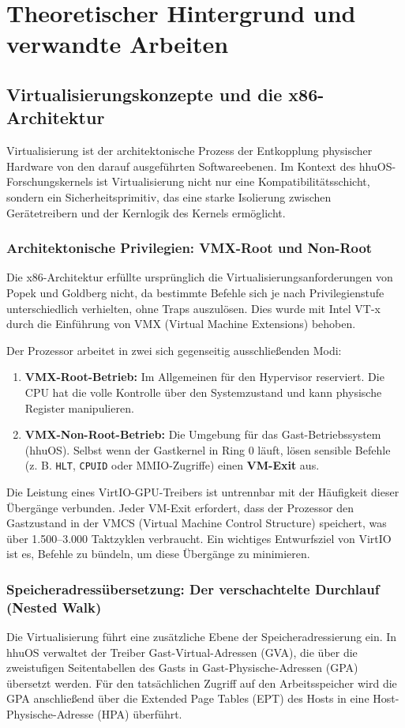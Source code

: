 \chapter{Theoretischer Hintergrund und verwandte Arbeiten}

\section{Virtualisierungskonzepte und die x86-Architektur}
Virtualisierung ist der architektonische Prozess der Entkopplung physischer Hardware von den darauf ausgeführten Softwareebenen. Im Kontext des hhuOS-Forschungskernels ist Virtualisierung nicht nur eine Kompatibilitätsschicht, sondern ein Sicherheitsprimitiv, das eine starke Isolierung zwischen Gerätetreibern und der Kernlogik des Kernels ermöglicht.

\subsection{Architektonische Privilegien: VMX-Root und Non-Root}
Die x86-Architektur erfüllte ursprünglich die Virtualisierungsanforderungen von Popek und Goldberg nicht, da bestimmte Befehle sich je nach Privilegienstufe unterschiedlich verhielten, ohne Traps auszulösen. Dies wurde mit Intel VT-x durch die Einführung von VMX (Virtual Machine Extensions) behoben.

Der Prozessor arbeitet in zwei sich gegenseitig ausschließenden Modi:
\begin{enumerate}
    \item \textbf{VMX-Root-Betrieb:} Im Allgemeinen für den Hypervisor reserviert. Die CPU hat die volle Kontrolle über den Systemzustand und kann physische Register manipulieren.
    \item \textbf{VMX-Non-Root-Betrieb:} Die Umgebung für das Gast-Betriebssystem (hhuOS). Selbst wenn der Gastkernel in Ring 0 läuft, lösen sensible Befehle (z. B. \texttt{HLT}, \texttt{CPUID} oder MMIO-Zugriffe) einen \textbf{VM-Exit} aus.
\end{enumerate}

Die Leistung eines VirtIO-GPU-Treibers ist untrennbar mit der Häufigkeit dieser Übergänge verbunden. Jeder VM-Exit erfordert, dass der Prozessor den Gastzustand in der VMCS (Virtual Machine Control Structure) speichert, was über 1.500–3.000 Taktzyklen verbraucht. Ein wichtiges Entwurfsziel von VirtIO ist es, Befehle zu bündeln, um diese Übergänge zu minimieren.

\subsection{Speicheradressübersetzung: Der verschachtelte Durchlauf (Nested Walk)}
Die Virtualisierung führt eine zusätzliche Ebene der Speicheradressierung ein. In hhuOS
verwaltet der Treiber Gast-Virtual-Adressen (GVA), die über die zweistufigen
Seitentabellen des Gasts in Gast-Physische-Adressen (GPA) übersetzt werden. Für den
tatsächlichen Zugriff auf den Arbeitsspeicher wird die GPA anschließend über die
Extended Page Tables (EPT) des Hosts in eine Host-Physische-Adresse (HPA) überführt.

